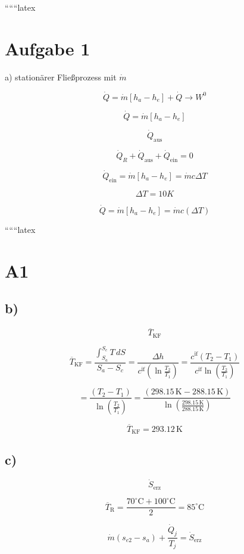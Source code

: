
``````latex


\section*{Aufgabe 1}

a) stationärer Fließprozess mit $\dot{m}$

\[
\dot{Q} = \dot{m} [h_a - h_e] + \dot{Q} \rightarrow W^0
\]

\[
\dot{Q} = \dot{m} [h_a - h_e]
\]

\[
\dot{Q}_{\text{aus}}
\]

\[
\dot{Q}_R + \dot{Q}_{\text{aus}} + \dot{Q}_{\text{ein}} = 0
\]

\[
\dot{Q}_{\text{ein}} = \dot{m} [h_a - h_e] = \dot{m} c \Delta T
\]

\[
\Delta T = 10K
\]

\[
\dot{Q} = \dot{m} [h_a - h_e] = \dot{m} c (\Delta T)
\]

``````latex


\section*{A1}
\subsection*{b)}

\[
\overline{T}_{\text{KF}}
\]

\[
\overline{T}_{\text{KF}} = \frac{\int_{S_a}^{S_c} T \, dS}{S_a - S_c} = \frac{\Delta h}{c^{\text{if}} \left( \ln \frac{T_2}{T_1} \right)} = \frac{c^{\text{if}} (T_2 - T_1)}{c^{\text{if}} \ln \left( \frac{T_2}{T_1} \right)}
\]

\[
= \frac{(T_2 - T_1)}{\ln \left( \frac{T_2}{T_1} \right)} = \frac{(298.15 \, \text{K} - 288.15 \, \text{K})}{\ln \left( \frac{298.15 \, \text{K}}{288.15 \, \text{K}} \right)}
\]

\[
\overline{T}_{\text{KF}} = 293.12 \, \text{K}
\]

\subsection*{c)}

\[
\dot{S}_{\text{erz}}
\]

\[
\overline{T}_{\text{R}} = \frac{70^\circ \text{C} + 100^\circ \text{C}}{2} = 85^\circ \text{C}
\]

\[
\dot{m} (s_{e2} - s_{a}) + \frac{\dot{Q}_j}{T_j} = \dot{S}_{\text{erz}}
\]

